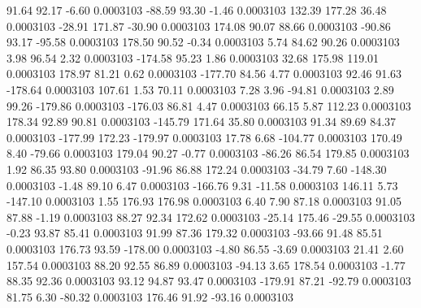        91.64       92.17       -6.60     0.0003103
      -88.59       93.30       -1.46     0.0003103
      132.39      177.28       36.48     0.0003103
      -28.91      171.87      -30.90     0.0003103
      174.08       90.07       88.66     0.0003103
      -90.86       93.17      -95.58     0.0003103
      178.50       90.52       -0.34     0.0003103
        5.74       84.62       90.26     0.0003103
        3.98       96.54        2.32     0.0003103
     -174.58       95.23        1.86     0.0003103
       32.68      175.98      119.01     0.0003103
      178.97       81.21        0.62     0.0003103
     -177.70       84.56        4.77     0.0003103
       92.46       91.63     -178.64     0.0003103
      107.61        1.53       70.11     0.0003103
        7.28        3.96      -94.81     0.0003103
        2.89       99.26     -179.86     0.0003103
     -176.03       86.81        4.47     0.0003103
       66.15        5.87      112.23     0.0003103
      178.34       92.89       90.81     0.0003103
     -145.79      171.64       35.80     0.0003103
       91.34       89.69       84.37     0.0003103
     -177.99      172.23     -179.97     0.0003103
       17.78        6.68     -104.77     0.0003103
      170.49        8.40      -79.66     0.0003103
      179.04       90.27       -0.77     0.0003103
      -86.26       86.54      179.85     0.0003103
        1.92       86.35       93.80     0.0003103
      -91.96       86.88      172.24     0.0003103
      -34.79        7.60     -148.30     0.0003103
       -1.48       89.10        6.47     0.0003103
     -166.76        9.31      -11.58     0.0003103
      146.11        5.73     -147.10     0.0003103
        1.55      176.93      176.98     0.0003103
        6.40        7.90       87.18     0.0003103
       91.05       87.88       -1.19     0.0003103
       88.27       92.34      172.62     0.0003103
      -25.14      175.46      -29.55     0.0003103
       -0.23       93.87       85.41     0.0003103
       91.99       87.36      179.32     0.0003103
      -93.66       91.48       85.51     0.0003103
      176.73       93.59     -178.00     0.0003103
       -4.80       86.55       -3.69     0.0003103
       21.41        2.60      157.54     0.0003103
       88.20       92.55       86.89     0.0003103
      -94.13        3.65      178.54     0.0003103
       -1.77       88.35       92.36     0.0003103
       93.12       94.87       93.47     0.0003103
     -179.91       87.21      -92.79     0.0003103
       81.75        6.30      -80.32     0.0003103
      176.46       91.92      -93.16     0.0003103
